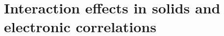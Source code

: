 \documentclass[../classnotes.tex]{subfiles}
\begin{document}
\chapter{Interaction effects in solids and electronic correlations}
\end{document}

